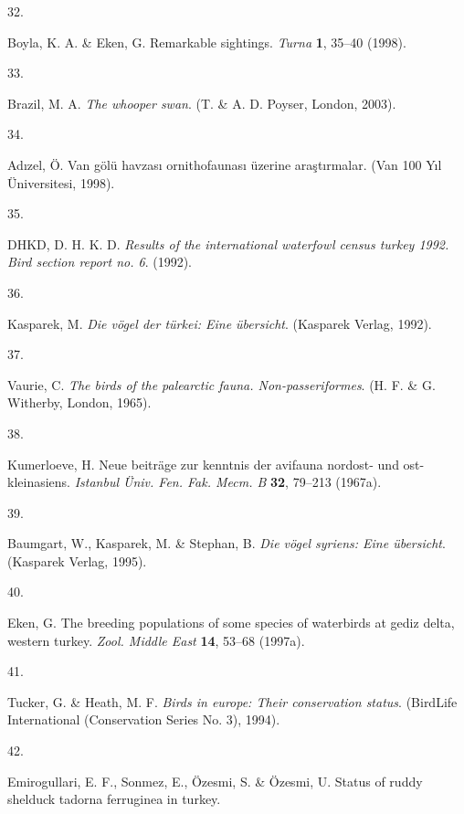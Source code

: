 \documentclass[
  letterpaper,
  DIV=11,
  numbers=noendperiod]{scrreprt}
\newlength{\cslhangindent}
\newlength{\csllabelwidth}
\newlength{\cslentryspacingunit} %
\newenvironment{CSLReferences}[2] %
 {%
  \setlength{\parindent}{0pt}
  \ifodd #1
  \let\oldpar\par
  \def\par{\hangindent=\cslhangindent\oldpar}
  \fi
  \setlength{\parskip}{#2\cslentryspacingunit}
 }%
 {}
\newcommand{\CSLLeftMargin}[1]{\parbox[t]{\csllabelwidth}{#1}}
\newcommand{\CSLRightInline}[1]{\parbox[t]{\linewidth - \csllabelwidth}{#1}\break}
\begin{document}
\begin{CSLReferences}{0}{0}
\leavevmode{}%
\CSLLeftMargin{32. }%
\CSLRightInline{Boyla, K. A. \& Eken, G. Remarkable sightings.
\emph{Turna} \textbf{1}, 35--40 (1998).}

\leavevmode{}%
\CSLLeftMargin{33. }%
\CSLRightInline{Brazil, M. A. \emph{The whooper swan}. (T. \& A. D.
Poyser, London, 2003).}

\leavevmode{}%
\CSLLeftMargin{34. }%
\CSLRightInline{Adızel, Ö. Van gölü havzası ornithofaunası üzerine
araştırmalar. (Van 100 Yıl Üniversitesi, 1998).}

\leavevmode{}%
\CSLLeftMargin{35. }%
\CSLRightInline{DHKD, D. H. K. D. \emph{Results of the international
waterfowl census turkey 1992. Bird section report no. 6}. (1992).}

\leavevmode{}%
\CSLLeftMargin{36. }%
\CSLRightInline{Kasparek, M. \emph{Die vögel der türkei: Eine
übersicht}. (Kasparek Verlag, 1992).}

\leavevmode{}%
\CSLLeftMargin{37. }%
\CSLRightInline{Vaurie, C. \emph{The birds of the palearctic fauna.
Non-passeriformes}. (H. F. \& G. Witherby, London, 1965).}

\leavevmode{}%
\CSLLeftMargin{38. }%
\CSLRightInline{Kumerloeve, H. Neue beiträge zur kenntnis der avifauna
nordost- und ost-kleinasiens. \emph{Istanbul Üniv. Fen. Fak. Mecm. B}
\textbf{32}, 79--213 (1967a).}

\leavevmode{}%
\CSLLeftMargin{39. }%
\CSLRightInline{Baumgart, W., Kasparek, M. \& Stephan, B. \emph{Die
vögel syriens: Eine übersicht}. (Kasparek Verlag, 1995).}

\leavevmode{}%
\CSLLeftMargin{40. }%
\CSLRightInline{Eken, G. The breeding populations of some species of
waterbirds at gediz delta, western turkey. \emph{Zool. Middle East}
\textbf{14}, 53--68 (1997a).}

\leavevmode{}%
\CSLLeftMargin{41. }%
\CSLRightInline{Tucker, G. \& Heath, M. F. \emph{Birds in europe: Their
conservation status}. (BirdLife International (Conservation Series No.
3), 1994).}

\leavevmode{}%
\CSLLeftMargin{42. }%
\CSLRightInline{Emirogullari, E. F., Sonmez, E., Özesmi, S. \& Özesmi,
U. Status of ruddy shelduck tadorna ferruginea in turkey.}


\end{CSLReferences}
\end{document}
